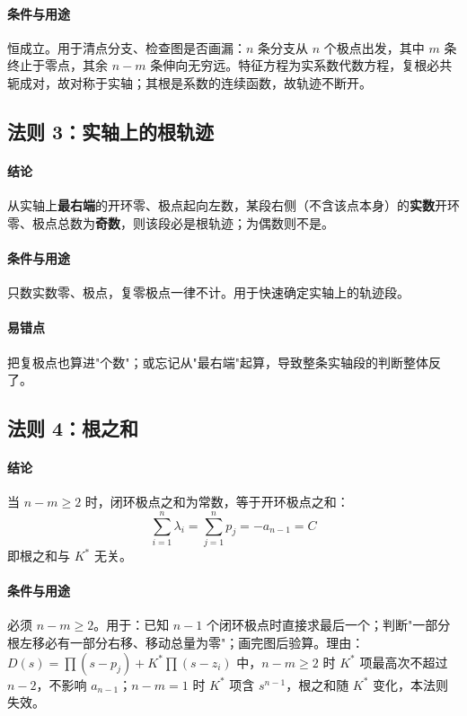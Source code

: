 \paragraph{条件与用途}恒成立。用于清点分支、检查图是否画漏：$n$ 条分支从 $n$ 个极点出发，其中 $m$ 条终止于零点，其余 $n-m$ 条伸向无穷远。特征方程为实系数代数方程，复根必共轭成对，故对称于实轴；其根是系数的连续函数，故轨迹不断开。

\subsection{法则 3：实轴上的根轨迹}
\paragraph{结论}从实轴上\textbf{最右端}的开环零、极点起向左数，某段右侧（不含该点本身）的\textbf{实数}开环零、极点总数为\textbf{奇数}，则该段必是根轨迹；为偶数则不是。

\paragraph{条件与用途}只数实数零、极点，复零极点一律不计。用于快速确定实轴上的轨迹段。

\paragraph{易错点}把复极点也算进"个数"；或忘记从"最右端"起算，导致整条实轴段的判断整体反了。

\subsection{法则 4：根之和}
\paragraph{结论}当 $n-m\ge2$ 时，闭环极点之和为常数，等于开环极点之和：
\[
\sum_{i=1}^{n}\lambda_i=\sum_{j=1}^{n}p_j=-a_{n-1}=C
\]
即根之和与 $K^*$ 无关。

\paragraph{条件与用途}必须 $n-m\ge2$。用于：已知 $n-1$ 个闭环极点时直接求最后一个；判断"一部分根左移必有一部分右移、移动总量为零"；画完图后验算。理由：$D(s)=\prod(s-p_j)+K^*\prod(s-z_i)$ 中，$n-m\ge2$ 时 $K^*$ 项最高次不超过 $n-2$，不影响 $a_{n-1}$；$n-m=1$ 时 $K^*$ 项含 $s^{n-1}$，根之和随 $K^*$ 变化，本法则失效。

